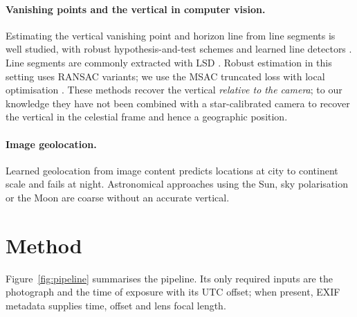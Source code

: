 \documentclass[11pt,a4paper]{article}
\begin{document}
\paragraph{Vanishing points and the vertical in computer vision.} Estimating the vertical vanishing point and horizon line from line segments is well studied, with robust hypothesis-and-test schemes \citep{zhai2016horizon} and learned line detectors \citep{pautrat2023deeplsd}. Line segments are commonly extracted with LSD \citep{vongioi2010lsd}. Robust estimation in this setting uses RANSAC variants; we use the MSAC truncated loss \citep{torr2000mlesac} with local optimisation \citep{chum2003lo}. These methods recover the vertical \emph{relative to the camera}; to our knowledge they have not been combined with a star-calibrated camera to recover the vertical in the celestial frame and hence a geographic position.

\paragraph{Image geolocation.} Learned geolocation from image content predicts locations at city to continent scale and fails at night. Astronomical approaches using the Sun, sky polarisation or the Moon are coarse without an accurate vertical.

\section{Method}
\label{sec:method}

Figure~\ref{fig:pipeline} summarises the pipeline. Its only required inputs are the photograph and the time of exposure with its UTC offset; when present, EXIF metadata supplies time, offset and lens focal length.
\end{document}
